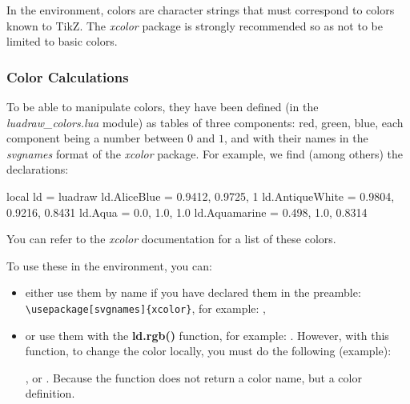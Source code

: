 In the \luadrawenv environment, colors are character strings that must correspond to colors known to TikZ. The \emph{xcolor} package is strongly recommended so as not to be limited to basic colors.

\subsubsection{Color Calculations}

To be able to manipulate colors, they have been defined (in the \emph{luadraw\_colors.lua} module) as tables of three components: red, green, blue, each component being a number between $0$ and $1$, and with their names in the \emph{svgnames} format of the \emph{xcolor} package. For example, we find (among others) the declarations:

\begin{Luacode}
local ld = luadraw
ld.AliceBlue = {0.9412, 0.9725, 1}
ld.AntiqueWhite = {0.9804, 0.9216, 0.8431}
ld.Aqua = {0.0, 1.0, 1.0}
ld.Aquamarine = {0.498, 1.0, 0.8314}
\end{Luacode}
You can refer to the \emph{xcolor} documentation for a list of these colors.

To use these in the \luadrawenv environment, you can:
\begin{itemize}
    \item either use them by name if you have declared them in the preamble: \verb|\usepackage[svgnames]{xcolor}|, for example: ,

    \item or use them with the \luadrawenv \textbf{ld.rgb()} function, for example: . However, with this  function, to change the color locally, you must do the following (example): \par
{}, or . Because the  function does not return a color name, but a color definition.
\end{itemize}

